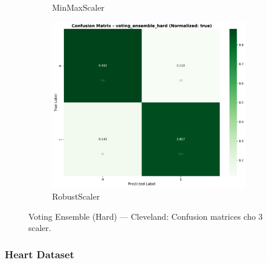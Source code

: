 \begin{figure}[H]
\begin{subfigure}[b]{0.31\textwidth}
\caption{MinMaxScaler}\label{fig:voting_clev_cm_minmax}
\end{subfigure}\hfill
\begin{subfigure}[b]{0.31\textwidth}\centering
\includegraphics[width=0.95\textwidth]{Result/cleveland_dataset/confusion_matrices/voting_ensemble_hard_numeric_dataset_RobustScaler.png}
\caption{RobustScaler}\label{fig:voting_clev_cm_robust}
\end{subfigure}
\caption{Voting Ensemble (Hard) — Cleveland: Confusion matrices cho 3 scaler.}
\label{fig:voting_clev_confusions}
\end{figure}

\FloatBarrier

\subsubsection{Heart Dataset}\label{subsubsec:voting-heart}

